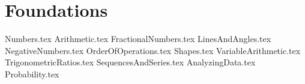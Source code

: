 \section{Foundations}

{Numbers.tex}
{Arithmetic.tex}
{FractionalNumbers.tex}
{LinesAndAngles.tex}
{NegativeNumbers.tex}
{OrderOfOperations.tex}
{Shapes.tex}
{VariableArithmetic.tex}
{TrigonometricRatios.tex}
{SequencesAndSeries.tex}
{AnalyzingData.tex}
{Probability.tex}